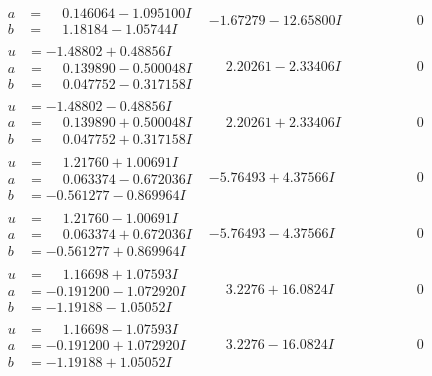 \documentclass[1p]{elsarticle_modified}
\theoremstyle{definition}
\begin{document}
$$\begin{array}{c|c|c}
\begin{aligned}
a &= \phantom{-}0.146064 - 1.095100 I \\
b &= \phantom{-}1.18184 - 1.05744 I\end{aligned}
 & -1.67279 - 12.65800 I & \phantom{-0.000000 } 0 \\ \hline\begin{aligned}
u &= -1.48802 + 0.48856 I \\
a &= \phantom{-}0.139890 - 0.500048 I \\
b &= \phantom{-}0.047752 - 0.317158 I\end{aligned}
 & \phantom{-}2.20261 - 2.33406 I & \phantom{-0.000000 } 0 \\ \hline\begin{aligned}
u &= -1.48802 - 0.48856 I \\
a &= \phantom{-}0.139890 + 0.500048 I \\
b &= \phantom{-}0.047752 + 0.317158 I\end{aligned}
 & \phantom{-}2.20261 + 2.33406 I & \phantom{-0.000000 } 0 \\ \hline\begin{aligned}
u &= \phantom{-}1.21760 + 1.00691 I \\
a &= \phantom{-}0.063374 - 0.672036 I \\
b &= -0.561277 - 0.869964 I\end{aligned}
 & -5.76493 + 4.37566 I & \phantom{-0.000000 } 0 \\ \hline\begin{aligned}
u &= \phantom{-}1.21760 - 1.00691 I \\
a &= \phantom{-}0.063374 + 0.672036 I \\
b &= -0.561277 + 0.869964 I\end{aligned}
 & -5.76493 - 4.37566 I & \phantom{-0.000000 } 0 \\ \hline\begin{aligned}
u &= \phantom{-}1.16698 + 1.07593 I \\
a &= -0.191200 - 1.072920 I \\
b &= -1.19188 - 1.05052 I\end{aligned}
 & \phantom{-}3.2276 + 16.0824 I & \phantom{-0.000000 } 0 \\ \hline\begin{aligned}
u &= \phantom{-}1.16698 - 1.07593 I \\
a &= -0.191200 + 1.072920 I \\
b &= -1.19188 + 1.05052 I\end{aligned}
 & \phantom{-}3.2276 - 16.0824 I & \phantom{-0.000000 } 0 \\ \hline\begin{aligned}

\end{aligned}
\end{array}$$
\end{document}
